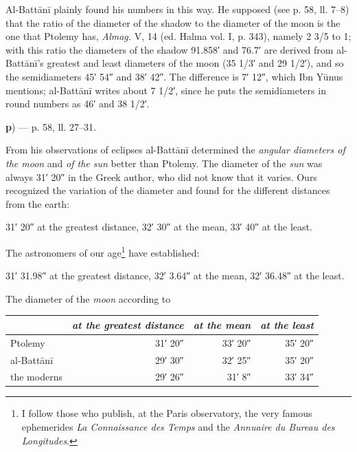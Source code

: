 \documentclass[11pt]{article}
\newcommand{\Pg}[1]{\marginpar{\footnotesize\color{gray}#1}}
\begin{document}
\par Al-Battānī plainly found his numbers in this way. He supposed (see p. 58, ll. 7–8) that the ratio of the diameter of the shadow to the diameter of the moon is the one that Ptolemy has, \emph{Almag.} V, 14 (ed. Halma vol. I, p. 343), namely 2 3/5 to 1; with this ratio the diameters of the shadow 91.858′ and 76.7′ are derived from al-Battānī's greatest and least diameters of the moon (35 1/3′ and 29 1/2′), and so the semidiameters 45′ 54″ and 38′ 42″. The difference is 7′ 12″, which Ibn Yūnus mentions; al-Battānī writes about 7 1/2′, since he puts the semidiameters in round numbers as 46′ and 38 1/2′.\par
\par\begin{center}\Pg{I 236}\textbf{p}) — p. 58, ll. 27–31.\end{center}
\par From his observations of eclipses al-Battānī determined the \emph{angular diameters of the moon} and \emph{of the sun} better than Ptolemy. The diameter of the \emph{sun} was always 31′ 20″ in the Greek author, who did not know that it varies. Ours recognized the variation of the diameter and found for the different distances from the earth:\par
\par\begin{center}31′ 20″ at the greatest distance, 32′ 30″ at the mean, 33′ 40″ at the least.\end{center}
\par The astronomers of our age\footnote{I follow those who publish, at the Paris observatory, the very famous ephemerides \emph{La Connaissance des Temps} and the \emph{Annuaire du Bureau des Longitudes}.} have established:\par
\par\begin{center}31′ 31.98″ at the greatest distance, 32′ 3.64″ at the mean, 32′ 36.48″ at the least.\end{center}
\par The diameter of the \emph{moon} according to\par
\begin{center}\small\begin{tabular}{lrrr}
 & \emph{at the greatest distance} & \emph{at the mean} & \emph{at the least} \\
\midrule
Ptolemy & 31′ 20″ & 33′ 20″ & 35′ 20″ \\
al-Battānī & 29′ 30″ & 32′ 25″ & 35′ 20″ \\
the moderns\footnotemark{} & 29′ 26″ & 31′ 8″ & 33′ 34″ \\
\end{tabular}\end{center}
\end{document}
